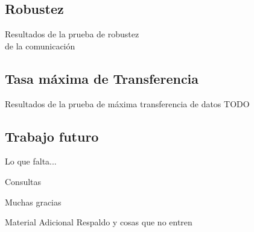 \documentclass[11pt,a4paper]{beamer}
\begin{document}
		\subsection{Robustez}
			\begin{frame}{Resultados de la prueba de robustez\\de la comunicación}
				
			\end{frame}
		\subsection{Tasa máxima de Transferencia}
			\begin{frame}{Resultados de la prueba de máxima transferencia de datos}
				TODO
			\end{frame}
		\subsection{Trabajo futuro}
			\begin{frame}{Lo que falta...}
				
			\end{frame}
			\begin{frame}{Consultas}
				
			\end{frame}
			\begin{frame}[c]
				\centering
				\alert {Muchas gracias}
			\end{frame}
			
			\begin{frame}{Material Adicional}
				\centering
				Respaldo y cosas que no entren
			\end{frame}
			\scriptsize{
			}
\end{document}
